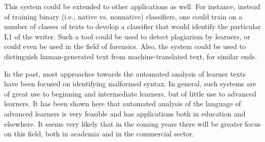 \documentclass[main.tex]{subfiles}
\begin{document}
This system could be extended to other applications as well. For instance, instead of training binary (i.e., native vs. nonnative) classifiers, one could train on a number of classes of texts to develop a classifier that would identify the particular L1 of the writer. Such a tool could be used to detect plagiarism by learners, or could even be used in the field of forensics. Also, the system could be used to distinguish human-generated text from machine-translated text, for similar ends.

In the past, most approaches towards the automated analysis of learner texts have been focused on identifying malformed syntax. In general, such systems are of great use to beginning and intermediate learners, but of little use to advanced learners. It has been shown here that automated analysis of the language of advanced learners is very feasible and has applications both in education and elsewhere. It seems very likely that in the coming years there will be greater focus on this field, both in academia and in the commercial sector. 

\biblio
\end{document}
